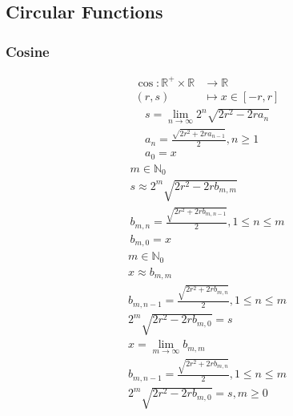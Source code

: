 \documentclass[a4paper,12pt]{report}
\begin{document}
\subsection{Circular Functions}
\subsubsection{Cosine}
\begin{equation}
\begin{aligned}
\cos \colon \mathbb{R}^{+} \times \mathbb{R} & \to \mathbb{R} \\
(r,s) & \mapsto x \in [-r,r]
\end{aligned}
\end{equation}
\begin{subequations}
\begin{gather}
s = \lim \limits_{n \to \infty} 2^n \sqrt{2r^2 - 2ra_n} \\
a_n = \frac{\sqrt{2r^2 + 2ra_{n-1}}}{2}, n \geq 1 \\
a_0 = x
\end{gather}
\end{subequations}
\begin{subequations}
\begin{gather}
m \in \mathbb{N}_{0} \\
s \approx 2^m \sqrt{2r^2 - 2rb_{m,m}} \\
b_{m,n} = \frac{\sqrt{2r^2 + 2rb_{m,n-1}}}{2}, 1 \leq n \leq m \\
b_{m,0} = x
\end{gather}
\end{subequations}
\begin{subequations}
\begin{gather}
m \in \mathbb{N}_{0} \\
x \approx b_{m,m} \\
b_{m,n-1} = \frac{\sqrt{2r^2 + 2rb_{m,n}}}{2}, 1 \leq n \leq m \\
2^m \sqrt{2r^2 - 2rb_{m,0}} = s
\end{gather}
\end{subequations}
\begin{subequations}
\begin{gather}
x = \lim \limits_{m \to \infty} b_{m,m} \\
b_{m,n-1} = \frac{\sqrt{2r^2 + 2rb_{m,n}}}{2}, 1 \leq n \leq m \\
2^m \sqrt{2r^2 - 2rb_{m,0}} = s, m \geq 0
\end{gather}
\end{subequations}
\end{document}
